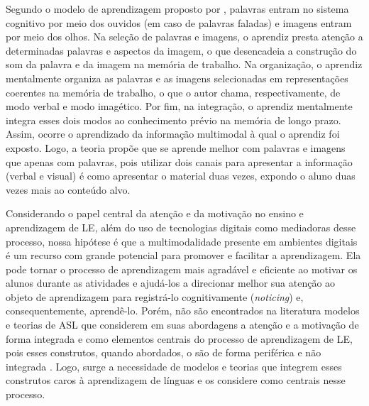 Segundo o modelo de aprendizagem proposto por \textcite{mayer2001}, palavras
entram no sistema cognitivo por meio dos ouvidos (em caso de palavras
faladas) e imagens entram por meio dos olhos. Na seleção de palavras e
imagens, o aprendiz presta atenção a determinadas palavras e aspectos da
imagem, o que desencadeia a construção do som da palavra e da imagem na
memória de trabalho. Na organização, o aprendiz mentalmente organiza as
palavras e as imagens selecionadas em representações coerentes na
memória de trabalho, o que o autor chama, respectivamente, de modo
verbal e modo imagético. Por fim, na integração, o aprendiz mentalmente
integra esses dois modos ao conhecimento prévio na memória de longo
prazo. Assim, ocorre o aprendizado da informação multimodal à qual o
aprendiz foi exposto. Logo, a teoria propõe que se aprende melhor com
palavras e imagens que apenas com palavras, pois utilizar dois canais
para apresentar a informação (verbal e visual) é como apresentar o
material duas vezes, expondo o aluno duas vezes mais ao conteúdo alvo.

Considerando o papel central da atenção e da motivação no ensino e
aprendizagem de LE, além do uso de tecnologias digitais como mediadoras
desse processo, nossa hipótese é que a multimodalidade presente em
ambientes digitais é um recurso com grande potencial para promover e
facilitar a aprendizagem. Ela pode tornar o processo de aprendizagem
mais agradável e eficiente ao motivar os alunos durante as atividades e
ajudá-los a direcionar melhor sua atenção ao objeto de aprendizagem para
registrá-lo cognitivamente (\emph{noticing}) e, consequentemente,
aprendê-lo. Porém, não são encontrados na literatura modelos e teorias
de ASL que considerem em suas abordagens a atenção e a motivação de
forma integrada e como elementos centrais do processo de aprendizagem de
LE, pois esses construtos, quando abordados, o são de forma periférica e
não integrada \cite{krashen1985,ellis1997,gass1997,hede2002,mayer2002,moreno2007,saito2015,monteiro2021}. Logo,
surge a necessidade de modelos e teorias que integrem esses construtos
caros à aprendizagem de línguas e os considere como centrais nesse
processo.
